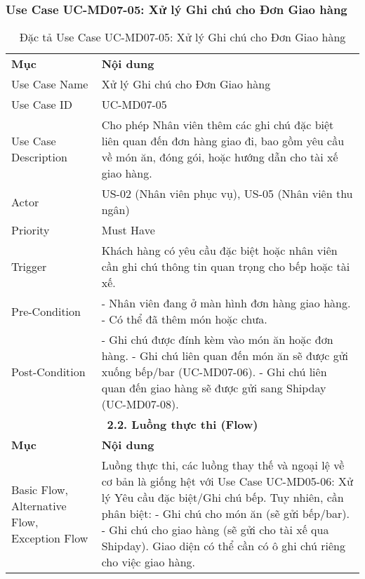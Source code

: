 \subsubsection{Use Case UC-MD07-05: Xử lý Ghi chú cho Đơn Giao hàng}

\begin{longtable}{|m{4cm}|p{11cm}|}
\caption{Đặc tả Use Case UC-MD07-05: Xử lý Ghi chú cho Đơn Giao hàng} \label{tab:uc_md07_05} \\
\hline

\endhead %
\hline
\endfoot %
\hline
\endlastfoot %
\multicolumn{2}{|c|}{\textbf{2.1. Tóm tắt (Summary)}} \\
\hline
\textbf{Mục} & \textbf{Nội dung} \\
\hline
Use Case Name & Xử lý Ghi chú cho Đơn Giao hàng \\
\hline
Use Case ID & UC-MD07-05 \\
\hline
Use Case Description & Cho phép Nhân viên thêm các ghi chú đặc biệt liên quan đến đơn hàng giao đi, bao gồm yêu cầu về món ăn, đóng gói, hoặc hướng dẫn cho tài xế giao hàng. \\
\hline
Actor & US-02 (Nhân viên phục vụ), US-05 (Nhân viên thu ngân) \\
\hline
Priority & Must Have \\
\hline
Trigger & Khách hàng có yêu cầu đặc biệt hoặc nhân viên cần ghi chú thông tin quan trọng cho bếp hoặc tài xế. \\
\hline
Pre-Condition & - Nhân viên đang ở màn hình đơn hàng giao hàng. \newline - Có thể đã thêm món hoặc chưa. \\
\hline
Post-Condition & - Ghi chú được đính kèm vào món ăn hoặc đơn hàng. \newline - Ghi chú liên quan đến món ăn sẽ được gửi xuống bếp/bar (UC-MD07-06). \newline - Ghi chú liên quan đến giao hàng sẽ được gửi sang Shipday (UC-MD07-08). \\
\hline
\multicolumn{2}{|c|}{\textbf{2.2. Luồng thực thi (Flow)}} \\
\hline
\textbf{Mục} & \textbf{Nội dung} \\
\hline
Basic Flow, Alternative Flow, Exception Flow & Luồng thực thi, các luồng thay thế và ngoại lệ về cơ bản là giống hệt với Use Case UC-MD05-06: Xử lý Yêu cầu đặc biệt/Ghi chú bếp. Tuy nhiên, cần phân biệt: \newline - Ghi chú cho món ăn (sẽ gửi bếp/bar). \newline - Ghi chú cho giao hàng (sẽ gửi cho tài xế qua Shipday). Giao diện có thể cần có ô ghi chú riêng cho việc giao hàng. \\

\end{longtable}
